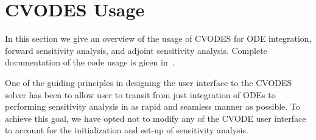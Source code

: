 \section{CVODES Usage}\label{s:usage}

In this section we give an overview of the usage of CVODES for ODE integration, 
forward sensitivity analysis, and adjoint sensitivity analysis. 
Complete documentation of the code usage is gicen in~\cite{HiSe:02}.

%
One of the guiding principles in designing the user interface to the 
CVODES solver has been to allow user to transit from just integration 
of ODEs to performing sensitivity analysis in as rapid and seamless 
manner as possible. To achieve this goal, we have opted not to 
modify any of the CVODE user interface to account for the initialization
and set-up of sensitivity analysis.

